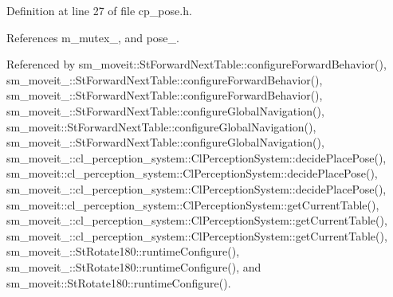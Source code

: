 Definition at line 27 of file cp\+\_\+pose.\+h.



References m\+\_\+mutex\+\_\+, and pose\+\_\+.



Referenced by sm\+\_\+moveit\+::\+St\+Forward\+Next\+Table\+::configure\+Forward\+Behavior(), sm\+\_\+moveit\+\_\+::\+St\+Forward\+Next\+Table\+::configure\+Forward\+Behavior(), sm\+\_\+moveit\+\_\+::\+St\+Forward\+Next\+Table\+::configure\+Forward\+Behavior(), sm\+\_\+moveit\+\_\+::\+St\+Forward\+Next\+Table\+::configure\+Global\+Navigation(), sm\+\_\+moveit\+::\+St\+Forward\+Next\+Table\+::configure\+Global\+Navigation(), sm\+\_\+moveit\+\_\+::\+St\+Forward\+Next\+Table\+::configure\+Global\+Navigation(), sm\+\_\+moveit\+\_\+::cl\+\_\+perception\+\_\+system\+::\+Cl\+Perception\+System\+::decide\+Place\+Pose(), sm\+\_\+moveit\+::cl\+\_\+perception\+\_\+system\+::\+Cl\+Perception\+System\+::decide\+Place\+Pose(), sm\+\_\+moveit\+\_\+::cl\+\_\+perception\+\_\+system\+::\+Cl\+Perception\+System\+::decide\+Place\+Pose(), sm\+\_\+moveit\+::cl\+\_\+perception\+\_\+system\+::\+Cl\+Perception\+System\+::get\+Current\+Table(), sm\+\_\+moveit\+\_\+::cl\+\_\+perception\+\_\+system\+::\+Cl\+Perception\+System\+::get\+Current\+Table(), sm\+\_\+moveit\+\_\+::cl\+\_\+perception\+\_\+system\+::\+Cl\+Perception\+System\+::get\+Current\+Table(), sm\+\_\+moveit\+\_\+::\+St\+Rotate180\+::runtime\+Configure(), sm\+\_\+moveit\+\_\+::\+St\+Rotate180\+::runtime\+Configure(), and sm\+\_\+moveit\+::\+St\+Rotate180\+::runtime\+Configure().


